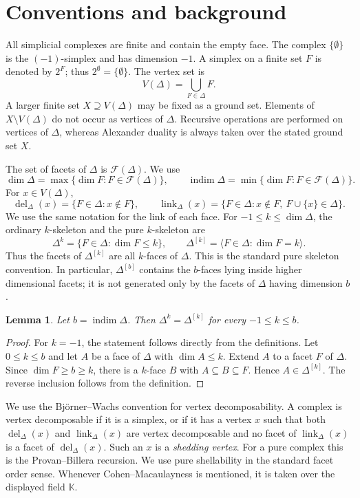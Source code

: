\documentclass[11pt]{amsart}
\newcommand{\K}{\mathbb K}
\newcommand{\F}{\mathcal F}
\DeclareMathOperator{\indim}{indim}
\DeclareMathOperator{\link}{link}
\DeclareMathOperator{\del}{del}
\newtheorem{lemma}[theorem]{Lemma}
\theoremstyle{definition}
\begin{document}
	\section{Conventions and background}\label{sec:2}
	
	All simplicial complexes are finite and contain the empty face.  The complex $\{\emptyset\}$ is the $(-1)$-simplex and has dimension $-1$.  A simplex on a finite set $F$ is denoted by $2^F$; thus $2^\emptyset=\{\emptyset\}$.  The vertex set is
	\[
	V(\Delta)=\bigcup_{F\in\Delta}F.
	\]
	A larger finite set $X\supseteq V(\Delta)$ may be fixed as a ground set. Elements of $X\setminus V(\Delta)$ do not occur as vertices of $\Delta$.  Recursive operations are performed on vertices of $\Delta$, whereas Alexander duality is always taken over the stated ground set $X$.
	
	The set of facets of $\Delta$ is $\F(\Delta)$.  We use
	\[
	\dim\Delta=\max\{\dim F:F\in\F(\Delta)\},
	\qquad
	\indim\Delta=\min\{\dim F:F\in\F(\Delta)\}.
	\]
	For $x\in V(\Delta)$,
	\[
	\del_\Delta(x)=\{F\in\Delta:x\notin F\},
	\qquad
	\link_\Delta(x)=\{F\in\Delta:x\notin F,\ F\cup\{x\}\in\Delta\}.
	\]
	We use the same notation for the link of each face. For $-1\leq k\leq\dim\Delta$, the ordinary $k$-skeleton and the pure $k$-skeleton are
	\[
	\Delta^k=\{F\in\Delta:\dim F\leq k\},
	\qquad
	\Delta^{[k]}=\langle F\in\Delta:\dim F=k\rangle.
	\]
	Thus the facets of $\Delta^{[k]}$ are all $k$-faces of $\Delta$.  This is the standard pure skeleton convention.  In particular, $\Delta^{[b]}$ contains the $b$-faces lying inside higher dimensional facets; it is not generated only by the facets of $\Delta$ having dimension $b$.
	
	\begin{lemma}\label{lem:1}
		Let $b=\indim\Delta$.  Then $\Delta^k=\Delta^{[k]}$ for every $-1\leq k\leq b$.
	\end{lemma}
	
	\begin{proof}
		For $k=-1$, the statement follows directly from the definitions.  Let $0\leq k\leq b$ and let $A$ be a face of $\Delta$ with $\dim A\leq k$.  Extend $A$ to a facet $F$ of $\Delta$.  Since $\dim F\geq b\geq k$, there is a $k$-face $B$ with $A\subseteq B\subseteq F$.  Hence $A\in\Delta^{[k]}$.  The reverse inclusion follows from the definition.
	\end{proof}
	
	We use the Bj\"orner--Wachs convention for vertex decomposability.  A complex is vertex decomposable if it is a simplex, or if it has a vertex $x$ such that both $\del_\Delta(x)$ and $\link_\Delta(x)$ are vertex decomposable and no facet of $\link_\Delta(x)$ is a facet of $\del_\Delta(x)$.  Such an $x$ is a \emph{shedding vertex}.  For a pure complex this is the Provan--Billera recursion.  We use pure shellability in the standard facet order sense.  Whenever Cohen--Macaulayness is mentioned, it is taken over the displayed field $\K$.
	
\end{document}
